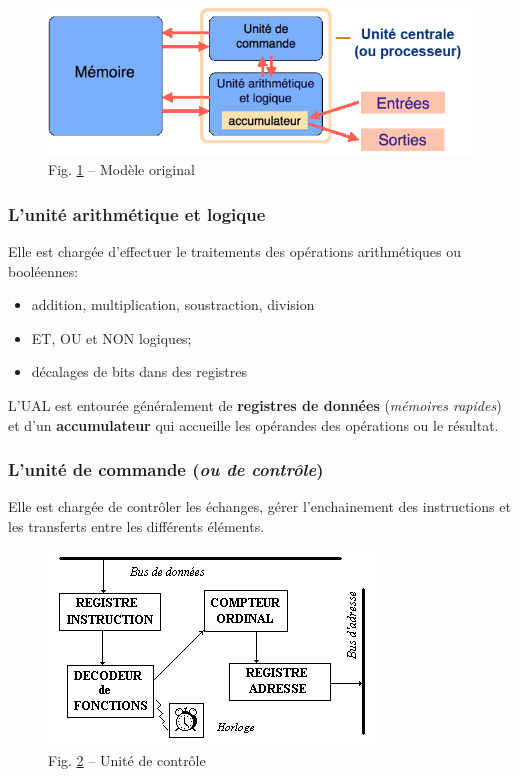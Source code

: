 \documentclass[11pt,french]{article}
\makeatletter
\def\maxwidth{\ifdim\Gin@nat@width>\linewidth\linewidth
    \else\Gin@nat@width\fi}
\let\Oldincludegraphics\includegraphics
\renewcommand{\includegraphics}[1]{\Oldincludegraphics[width=.8\maxwidth]{#1}}
\providecommand{\tightlist}{%
      \setlength{\itemsep}{0pt}\setlength{\parskip}{0pt}}
\makeatother
\begin{document}
\begin{figure}[h]
	\begin{center}
		\includegraphics{../img/modele-originel2.png}
	\end{center}
	\caption{Fig. \ref{fig:modeloriginal} -- Modèle original}
	\label{fig:modeloriginal}
\end{figure}

\hypertarget{uniteAL}{%
\subsubsection{L'unité arithmétique et logique}\label{uniteAL}}

 Elle est chargée d'effectuer le traitements des opérations   arithmétiques ou booléennes:
\begin{itemize}
\tightlist
\item addition, multiplication, soustraction, division
\item ET, OU et NON logiques;
\item décalages de bits dans des registres
\end{itemize}

L'UAL est entourée généralement de \textbf{registres de données}
(\textit{mémoires rapides}) et d'un \textbf{accumulateur} qui accueille les opérandes des
opérations ou le résultat.

\hypertarget{unitcontrol}{%
\subsubsection{L'unité de commande (\emph{ou de contrôle})}\label{unitcontrol}}

  Elle est chargée de contrôler les échanges, gérer l'enchainement des
  instructions et les transferts entre les différents éléments.
\begin{figure}[h]
	\begin{center}  
  		\includegraphics{../img/control_unit.png} 
	\end{center}
	\caption{Fig. \ref{fig:controlunit} -- Unité de contrôle}
	\label{fig:controlunit}
\end{figure}
\end{document}
